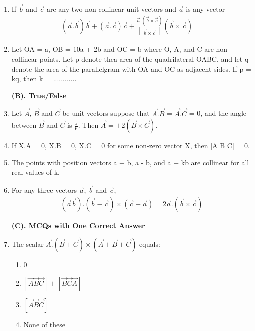 \begin{enumerate}[label=\arabic*.,ref=\thesubsection.\theenumi]
\item If $\overrightarrow{b}$ and $\overrightarrow{c}$ are any two non-collinear unit vectors and $\overrightarrow{a}$ is any vector 
\begin{align*}
(\overrightarrow{a} . \overrightarrow{b})\overrightarrow{b} + (\overrightarrow{a} . \overrightarrow{c})\overrightarrow{c} + \frac{\overrightarrow{a} . (\overrightarrow{b} \times \overrightarrow{c})}{\begin{vmatrix} \overrightarrow{b} \times \overrightarrow{c} \end{vmatrix}} (\overrightarrow{b} \times \overrightarrow{c}) =
\end{align*}

\item Let OA = a, OB = 10a + 2b and OC = b where O, A, and C are non-collinear points. Let p denote thea area of the quadrilateral OABC, and let q denote the area of the parallelgram with OA and OC as adjacent sides. If p = kq, then k = ............

\textbf{(B). True/False}

\item Let $\overrightarrow{A}$, $\overrightarrow{B}$ and $\overrightarrow{C}$ be unit vectors suppose that $\overrightarrow{A}.\overrightarrow{B}$ = $\overrightarrow{A}.\overrightarrow{C}$ = 0, and the angle between $\overrightarrow{B}$ and $\overrightarrow{C}$ is $\frac{\pi}{6}$. Then $\overrightarrow{A}$ = $\pm 2(\overrightarrow{B} \times \overrightarrow{C})$.

\item If X.A = 0, X.B = 0, X.C = 0 for some non-zero vector X, then [A B C] = 0.

\item The points with position vectors a + b, a - b, and a + kb are collinear for all real values of k.

\item For any three vectors $\overrightarrow{a}$, $\overrightarrow{b}$ and $\overrightarrow{c}$, 
\begin{align*}
(\overrightarrow{a}  \overrightarrow{b}) . (\overrightarrow{b} - \overrightarrow{c}) \times (\overrightarrow{c} - \overrightarrow{a}) = 2\overrightarrow{a} . (\overrightarrow{b} \times \overrightarrow{c})
\end{align*}

\textbf{(C). MCQs with One Correct Answer}
\item The scalar $\overrightarrow{A} . (\overrightarrow{B} + \overrightarrow{C}) \times (\overrightarrow{A} + \overrightarrow{B} + \overrightarrow{C})$ equals:
\begin{enumerate}
\item 0
\item $[\overrightarrow{A}  \overrightarrow{B}  \overrightarrow{C}] + [\overrightarrow{B} \overrightarrow{C} \overrightarrow{A}]$
\item $[\overrightarrow{A} \overrightarrow{B} \overrightarrow{C}]$
\item None of these
\end{enumerate}


\end{enumerate}
